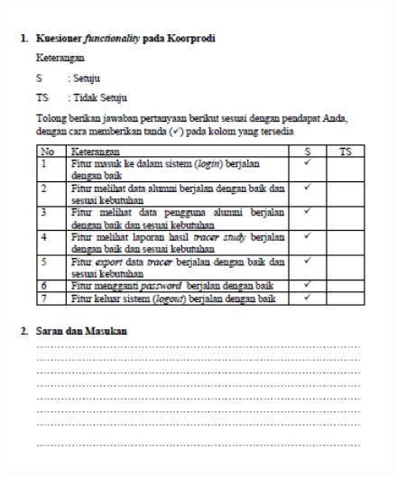 \begin{figure}[H]
	\centering
	\includegraphics[width=15cm,height=18cm]{gambar/UAT/kf_koorprodi}
	\label{kf_koorprodi}
\end{figure}

